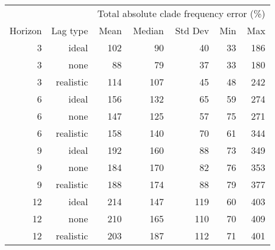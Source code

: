 
\begin{tabular*}{0.7\textwidth}{rrrrrrr}
\toprule
        &            & \multicolumn{5}{c}{Total absolute clade frequency error (\%)} \\
Horizon & Lag type & Mean & Median & Std Dev & Min & Max \\
\midrule

3 & ideal & 102 & 90 & 40 & 33 & 186 \\
3 & none & 88 & 79 & 37 & 33 & 180 \\
3 & realistic & 114 & 107 & 45 & 48 & 242 \\
6 & ideal & 156 & 132 & 65 & 59 & 274 \\
6 & none & 147 & 125 & 57 & 75 & 271 \\
6 & realistic & 158 & 140 & 70 & 61 & 344 \\
9 & ideal & 192 & 160 & 88 & 73 & 349 \\
9 & none & 184 & 170 & 82 & 76 & 353 \\
9 & realistic & 188 & 174 & 88 & 79 & 377 \\
12 & ideal & 214 & 147 & 119 & 60 & 403 \\
12 & none & 210 & 165 & 110 & 70 & 409 \\
12 & realistic & 203 & 187 & 112 & 71 & 401 \\

\bottomrule
\end{tabular*}

